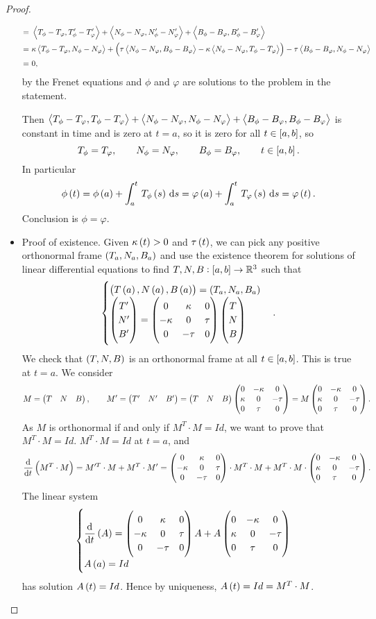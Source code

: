 \begin{proof}
\begin{itemize}
\begin{align*}
= \ & \abr{T_\phi - T_\varphi, T_\phi' - T_\varphi'} + \abr{N_\phi - N_\varphi, N_\phi' - N_\varphi'} + \abr{B_\phi - B_\varphi, B_\phi' - B_\varphi'} \\
= \ & \kappa\abr{T_\phi - T_\varphi, N_\phi - N_\varphi} + \br{\tau\abr{N_\phi - N_\varphi, B_\phi - B_\varphi} - \kappa\abr{N_\phi - N_\varphi, T_\phi - T_\varphi}} - \tau\abr{B_\phi - B_\varphi, N_\phi - N_\varphi} \\
= \ & 0,
\end{align*}
by the Frenet equations and $ \phi $ and $ \varphi $ are solutions to the problem in the statement.

\pagebreak

Then $ \left\langle T_\phi - T_\varphi, T_\phi - T_\varphi \right\rangle + \left\langle N_\phi - N_\varphi, N_\phi - N_\varphi \right\rangle + \left\langle B_\phi - B_\varphi, B_\phi - B_\varphi \right\rangle $ is constant in time and is zero at $ t = a $, so it is zero for all $ t \in \sbr{a, b} $, so
$$ T_\phi = T_\varphi, \qquad N_\phi = N_\varphi, \qquad B_\phi = B_\varphi, \qquad t \in \sbr{a, b}. $$
In particular
$$ \phi\br{t} = \phi\br{a} + \intd{a}{t}{T_\phi\br{s}}{s} = \varphi\br{a} + \intd{a}{t}{T_\varphi\br{s}}{s} = \varphi\br{t}. $$
Conclusion is $ \phi = \varphi $.
\item Proof of existence. Given $ \kappa\br{t} > 0 $ and $ \tau\br{t} $, we can pick any positive orthonormal frame $ \br{T_a, N_a, B_a} $ and use the existence theorem for solutions of linear differential equations to find $ T, N, B : \sbr{a, b} \to \R^3 $ such that
$$
\begin{cases}
\br{T\br{a}, N\br{a}, B\br{a}} = \br{T_a, N_a, B_a} \\
\threebyone{T'}{N'}{B'} = \threebythree{0}{\kappa}{0}{-\kappa}{0}{\tau}{0}{-\tau}{0}\threebyone{T}{N}{B}
\end{cases}.
$$
We check that $ \br{T, N, B} $ is an orthonormal frame at all $ t \in \sbr{a, b} $. This is true at $ t = a $. We consider
$$ M = \begin{pmatrix} T & N & B \end{pmatrix}, \qquad M' = \begin{pmatrix} T' & N' & B' \end{pmatrix} = \begin{pmatrix} T & N & B \end{pmatrix}\begin{pmatrix} 0 & -\kappa & 0 \\ \kappa & 0 & -\tau \\ 0 & \tau & 0 \end{pmatrix} = M\begin{pmatrix} 0 & -\kappa & 0 \\ \kappa & 0 & -\tau \\ 0 & \tau & 0 \end{pmatrix}. $$
As $ M $ is orthonormal if and only if $ M^T \cdot M = Id $, we want to prove that $ M^T \cdot M = Id $. $ M^T \cdot M = Id $ at $ t = a $, and
$$ \dod{}{t}\br{M^T \cdot M} = M'^T \cdot M + M^T \cdot M' = \threebythree{0}{\kappa}{0}{-\kappa}{0}{\tau}{0}{-\tau}{0} \cdot M^T \cdot M + M^T \cdot M \cdot \threebythree{0}{-\kappa}{0}{\kappa}{0}{-\tau}{0}{\tau}{0}. $$
The linear system
$$
\begin{cases}
\dod{}{t}\br{A} = \threebythree{0}{\kappa}{0}{-\kappa}{0}{\tau}{0}{-\tau}{0}A + A\threebythree{0}{-\kappa}{0}{\kappa}{0}{-\tau}{0}{\tau}{0} \\
A\br{a} = Id
\end{cases}
$$
has solution $ A\br{t} = Id $. Hence by uniqueness, $ A\br{t} = Id = M^T \cdot M $.
\end{itemize}
\end{proof}

